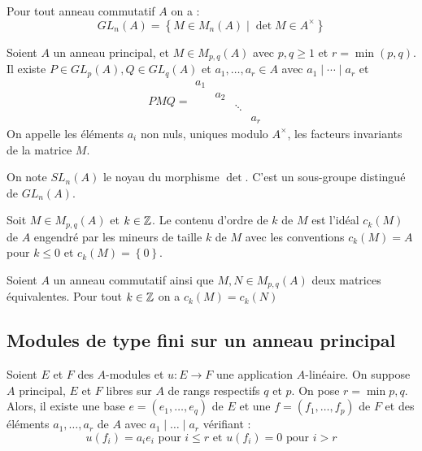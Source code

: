 \documentclass{cours}
\begin{document}
\begin{proposition}
    Pour tout anneau commutatif $A$ on a :
    \[
        GL_{n}(A) = \left\{M \in M_{n}(A) \mid \det M \in A^{\times}\right\}
    \]
\end{proposition}

\begin{theorem}
    Soient $A$ un anneau principal, et $M \in M_{p, q}(A)$ avec $p,q \geq 1$ et $r = \min({p, q})$. Il existe $P \in GL_{p}(A), Q \in GL_{q}(A)$ et $a_{1}, \ldots, a_{r} \in A$ avec $a_{1}\mid \cdots \mid a_{r}$ et
    \[
        PMQ = \begin{matrix}
            a_{1} &       &        &       & \\
                  & a_{2} &        &       & \\
                  &       & \ddots &       & \\
                  &       &        & a_{r} &
        \end{matrix}
    \]
    On appelle les éléments $a_{i}$ non nuls, uniques modulo $A^{\times}$, les facteurs invariants de la matrice $M$.
\end{theorem}

\begin{definition}
    On note $SL_{n}(A)$ le noyau du morphisme $\det$. C'est un sous-groupe distingué de $GL_{n}(A)$.
\end{definition}

\begin{definition}
    Soit $M \in M_{p, q}(A)$ et $k \in \mathbb{Z}$. Le contenu d'ordre de $k$ de $M$ est l'idéal $c_{k}(M)$ de $A$ engendré par les mineurs de taille $k$ de $M$ avec les conventions $c_{k}(M) = A$ pour $k \leq 0$ et $c_{k}(M) = \left\{0\right\}$.
\end{definition}

\begin{lemma}
    Soient $A$ un anneau commutatif ainsi que $M, N \in M_{p, q}(A)$ deux matrices équivalentes. Pour tout $k \in \mathbb{Z}$ on a $c_{k}(M) = c_{k}(N)$
\end{lemma}

\subsection{Modules de type fini sur un anneau principal}
\begin{theorem}
    Soient $E$ et $F$ des $A$-modules et $u : E \to F$ une application $A$-linéaire. On suppose $A$ principal, $E$ et $F$ libres sur $A$ de rangs respectifs $q$ et $p$. On pose $r = \min p, q$.
    Alors, il existe une base $e = \left(e_{1},\ldots, e_{q}\right)$ de $E$ et une $f = \left(f_{1}, \ldots, f_{p}\right)$ de $F$ et des éléments $a_{1}, \ldots, a_{r}$ de $A$ avec $a_{1} \mid \ldots \mid a_{r}$ vérifiant :
    \[
        u(f_{i}) = a_{i}e_{i} \text{ pour } i \leq r \text{ et } u(f_{i}) = 0 \text{ pour } i > r
    \]
\end{theorem}
\end{document}
